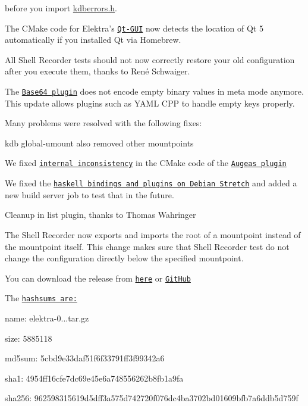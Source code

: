 before you import {\ttfamily \hyperlink{kdberrors_8h}{kdberrors.\+h}}.


\begin{DoxyItemize}
\item The C\+Make code for Elektra’s \href{https://www.libelektra.org/tools/qt-gui}{\tt Qt-\/\+G\+UI} now detects the location of Qt 5 automatically if you installed Qt via Homebrew.
\item All Shell Recorder tests should not now correctly restore your old configuration after you execute them, thanks to René Schwaiger.
\item The \href{https://www.libelektra.org/plugins/base64}{\tt Base64 plugin} does not encode empty binary values in meta mode anymore. This update allows plugins such as Y\+A\+ML C\+PP to handle empty keys properly.
\end{DoxyItemize}

Many problems were resolved with the following fixes\+:


\begin{DoxyItemize}
\item {\ttfamily kdb global-\/umount} also removed other mountpoints
\item We fixed \href{https://github.com/ElektraInitiative/libelektra/pull/1761}{\tt internal inconsistency} in the C\+Make code of the \href{https://www.libelektra.org/plugins/augeas}{\tt Augeas plugin}
\item We fixed the \href{https://github.com/ElektraInitiative/libelektra/pull/1787}{\tt haskell bindings and plugins on Debian Stretch} and added a new build server job to test that in the future.
\item Cleanup in list plugin, thanks to Thomas Wahringer
\item The Shell Recorder now exports and imports the root of a mountpoint instead of the mountpoint itself. This change makes sure that Shell Recorder test do not change the configuration directly below the specified mountpoint.
\end{DoxyItemize}

You can download the release from \href{https://www.libelektra.org/ftp/elektra/releases/elektra-0.8.22.tar.gz}{\tt here} or \href{https://github.com/ElektraInitiative/ftp/blob/master/releases/elektra-0.8.22.tar.gz?raw=true}{\tt Git\+Hub}

The \href{https://github.com/ElektraInitiative/ftp/blob/master/releases/elektra-0.8.22.tar.gz.hashsum?raw=true}{\tt hashsums are\+:}


\begin{DoxyItemize}
\item name\+: elektra-\/0...\+tar.\+gz
\item size\+: 5885118
\item md5sum\+: 5cbd9e33daf51f6f33791ff3f99342a6
\item sha1\+: 4954ff16cfe7dc69e45e6a748556262b8fb1a9fa
\item sha256\+: 962598315619d5dff3a575d742720f076dc4ba3702bd01609bfb7a6ddb5d759f
\end{DoxyItemize}

